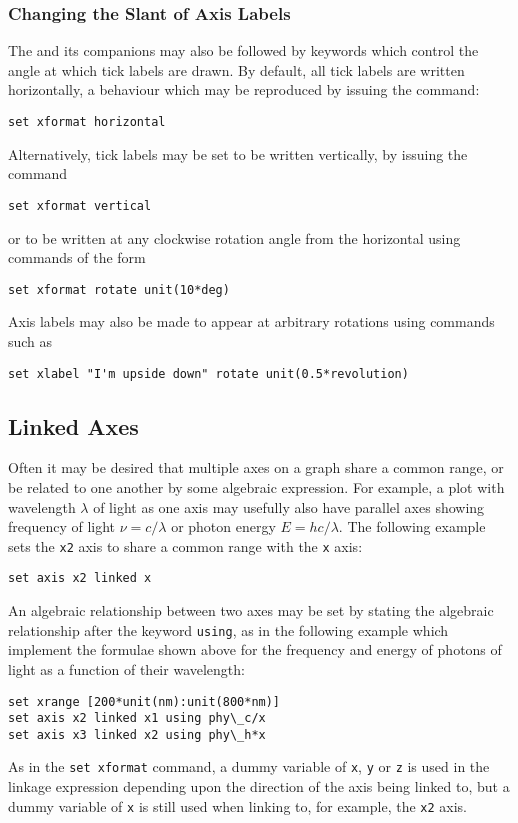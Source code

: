 \subsubsection{Changing the Slant of Axis Labels}

The  and its companions may also be followed by keywords
which control the angle at which tick labels are drawn. By default, all tick
labels are written horizontally, a behaviour which may be reproduced by issuing
the command:
\begin{verbatim}
set xformat horizontal
\end{verbatim}
Alternatively, tick labels may be set to be written vertically, by issuing the command
\begin{verbatim}
set xformat vertical
\end{verbatim}
or to be written at any clockwise rotation angle from the horizontal using commands of the form
\begin{verbatim}
set xformat rotate unit(10*deg)
\end{verbatim}

Axis labels may also be made to appear at arbitrary rotations using commands such as
\begin{verbatim}
set xlabel "I'm upside down" rotate unit(0.5*revolution)
\end{verbatim}

\subsection{Linked Axes}
\label{sec:linked_axes}

Often it may be desired that multiple axes on a graph share a common range, or
be related to one another by some algebraic expression. For example, a plot
with wavelength $\lambda$ of light as one axis may usefully also have parallel
axes showing frequency of light $\nu=c/\lambda$ or photon energy
$E=hc/\lambda$. The following example sets the {\tt x2} axis to share a common
range with the {\tt x} axis:
\begin{verbatim}
set axis x2 linked x
\end{verbatim}
An algebraic relationship between two axes may be set by stating the algebraic
relationship after the keyword {\tt using}, as in the following example which
implement the formulae shown above for the frequency and energy of photons of
light as a function of their wavelength:
\begin{verbatim}
set xrange [200*unit(nm):unit(800*nm)]
set axis x2 linked x1 using phy\_c/x
set axis x3 linked x2 using phy\_h*x
\end{verbatim}
As in the {\tt set xformat} command, a dummy variable of {\tt x}, {\tt y} or
{\tt z} is used in the linkage expression depending upon the direction of the
axis being linked to, but a dummy variable of {\tt x} is still used when
linking to, for example, the {\tt x2} axis.

